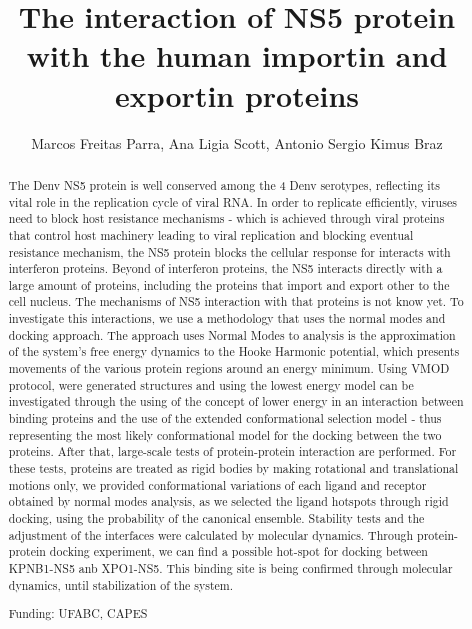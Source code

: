 \documentclass[twoside]{article}
\title{\vspace{-15mm}\fontsize{24pt}{10pt}\selectfont\textbf{ The interaction of NS5 protein with the human importin and exportin proteins }} %
\author{ Marcos Freitas Parra, Ana Ligia Scott, Antonio Sergio Kimus Braz }
\affil{ UFABC }
\date{}
\begin{document}
  
  
  \maketitle %
  
  
  \thispagestyle{fancy} %
  
  
  \begin{abstract}
  The Denv NS5 protein is well conserved among the 4 Denv serotypes,  reflecting its vital role in the replication cycle of viral RNA. In order to replicate efficiently,  viruses need to block host resistance mechanisms - which is achieved through viral proteins that control host machinery leading to viral replication and blocking eventual resistance mechanism,  the NS5 protein blocks the cellular response for interacts with interferon proteins. Beyond of interferon proteins,  the NS5 interacts directly with a large amount of proteins,  including the proteins that import and export other to the cell nucleus. The mechanisms of NS5 interaction with that proteins is not know yet. To investigate this interactions,  we use a methodology that uses the normal modes and docking approach. The approach uses Normal Modes to analysis is the approximation of the system’s free energy dynamics to the Hooke Harmonic potential,  which presents movements of the various protein regions around an energy minimum. Using VMOD protocol,  were generated structures and using the lowest energy model can be investigated through the using of the concept of lower energy in an interaction between binding proteins and the use of the extended conformational selection model - thus representing the most likely conformational model for the docking between the two proteins. After that,  large-scale tests of protein-protein interaction are performed. For these tests,  proteins are treated as rigid bodies by making rotational and translational motions only,  we provided conformational variations of each ligand and receptor obtained by normal modes analysis,  as we selected the ligand hotspots through rigid docking,  using the probability of the canonical ensemble. Stability tests and the adjustment of the interfaces were calculated by molecular dynamics. Through protein-protein docking experiment,  we can find a possible hot-spot for docking between KPNB1-NS5 anb XPO1-NS5. This binding site is being confirmed through molecular dynamics,  until stabilization of the system.
  
  Funding: UFABC,  CAPES \\ 
  \end{abstract}
  
\end{document}
